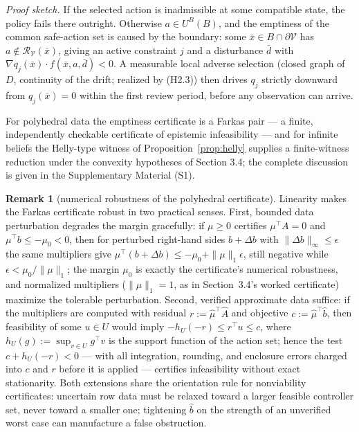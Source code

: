 \documentclass[10pt,twocolumn]{article}
\theoremstyle{definition}
\newtheorem{remark}{Remark}
\begin{document}
\emph{Proof sketch.} If the selected action is inadmissible at some compatible state, the policy fails there outright. Otherwise \(a \in U^B(B)\), and the emptiness of the common safe-action set is caused by the boundary: some \(\bar x \in B \cap \partial\mathcal{V}\) has \(a \notin \mathcal{R}_{\mathcal{V}}(\bar x)\), giving an active constraint \(j\) and a disturbance \(\bar d\) with \(\nabla q_j(\bar x) \cdot f(\bar x, a, \bar d) < 0\). A measurable local adverse selection (closed graph of \(D\), continuity of the drift; realized by (H2.3)) then drives \(q_j\) strictly downward from \(q_j(\bar x) = 0\) within the first review period, before any observation can arrive.

For polyhedral data the emptiness certificate is a Farkas pair --- a finite, independently checkable certificate of epistemic infeasibility --- and for infinite beliefs the Helly-type witness of Proposition~\ref{prop:helly} supplies a finite-witness reduction under the convexity hypotheses of Section 3.4; the complete discussion is given in the Supplementary Material (S1).

\begin{remark}[numerical robustness of the polyhedral certificate]\label{rem:robust-farkas}
Linearity makes the Farkas certificate robust in two practical senses. First,
bounded data perturbation degrades the margin gracefully: if
\(\mu \ge 0\) certifies \(\mu^{\top} A = 0\) and \(\mu^{\top} b \le -\mu_0 < 0\),
then for perturbed right-hand sides \(b + \Delta b\) with
\(\|\Delta b\|_\infty \le \epsilon\) the same multipliers give
\(\mu^{\top}(b + \Delta b) \le -\mu_0 + \|\mu\|_1 \epsilon\), still negative
while \(\epsilon < \mu_0/\|\mu\|_1\); the margin \(\mu_0\) is exactly the
certificate's numerical robustness, and normalized multipliers
(\(\|\mu\|_1 = 1\), as in Section~3.4's worked certificate) maximize the
tolerable perturbation. Second, verified approximate data suffice: if the
multipliers are computed with residual \(r := \hat\mu^{\top} \hat A\) and
objective \(c := \hat\mu^{\top} \hat b\), then feasibility of some
\(u \in U\) would imply \(-h_U(-r) \le r^{\top} u \le c\), where
\(h_U(g) := \sup_{v \in U} g^{\top} v\) is the support function of the action
set; hence the test \(c + h_U(-r) < 0\) --- with all integration, rounding,
and enclosure errors charged into \(c\) and \(r\) before it is applied ---
certifies infeasibility without exact stationarity. Both extensions share the
orientation rule for nonviability certificates: uncertain row data must be
relaxed toward a larger feasible controller set, never toward a smaller one;
tightening \(\hat b\) on the strength of an unverified worst case can
manufacture a false obstruction.
\end{remark}
\end{document}
